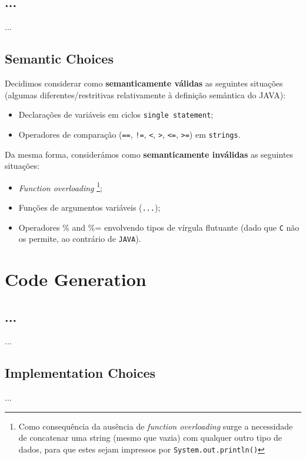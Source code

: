 \documentclass[a4paper]{article}
\begin{document}
\subsection{...}
\indent \indent ...

\subsection{Semantic Choices}
\label{semantic_choices}
\indent \indent Decidimos considerar como \textbf{semanticamente válidas} as seguintes situações (algumas diferentes/restritivas relativamente à definição semântica do JAVA):
\begin{itemize}
	\item Declarações de variáveis em ciclos \texttt{single statement};
	\item Operadores de comparação (\texttt{==}, \texttt{!=}, \texttt{<}, \texttt{>}, \texttt{<=}, \texttt{>=}) em \texttt{strings}.
\end{itemize}

Da mesma forma, considerámos como \textbf{semanticamente inválidas} as seguintes situações:
\begin{itemize}
	\item \textit{Function overloading} \footnote[1]{Como consequência da ausência de \textit{function overloading} surge a necessidade de concatenar
		uma string (mesmo que vazia) com qualquer outro tipo de dados, para que estes sejam impressos por \texttt{System.out.println()}};
	\item Funções de argumentos variáveis (\texttt{...});
	\item Operadores \% and \%= envolvendo tipos de vírgula flutuante (dado que \texttt{C} não os permite, ao contrário de \texttt{JAVA}).
\end{itemize}

\cleardoublepage

\section{Code Generation}
\subsection{...}
\indent \indent ...

\subsection{Implementation Choices}
\indent \indent ...
\end{document}
